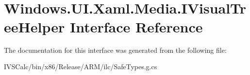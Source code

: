 \hypertarget{interface_windows_1_1_u_i_1_1_xaml_1_1_media_1_1_i_visual_tree_helper}{}\section{Windows.\+U\+I.\+Xaml.\+Media.\+I\+Visual\+Tree\+Helper Interface Reference}
\label{interface_windows_1_1_u_i_1_1_xaml_1_1_media_1_1_i_visual_tree_helper}


The documentation for this interface was generated from the following file\+:\begin{DoxyCompactItemize}
\item 
I\+V\+S\+Calc/bin/x86/\+Release/\+A\+R\+M/ilc/Safe\+Types.\+g.\+cs\end{DoxyCompactItemize}

